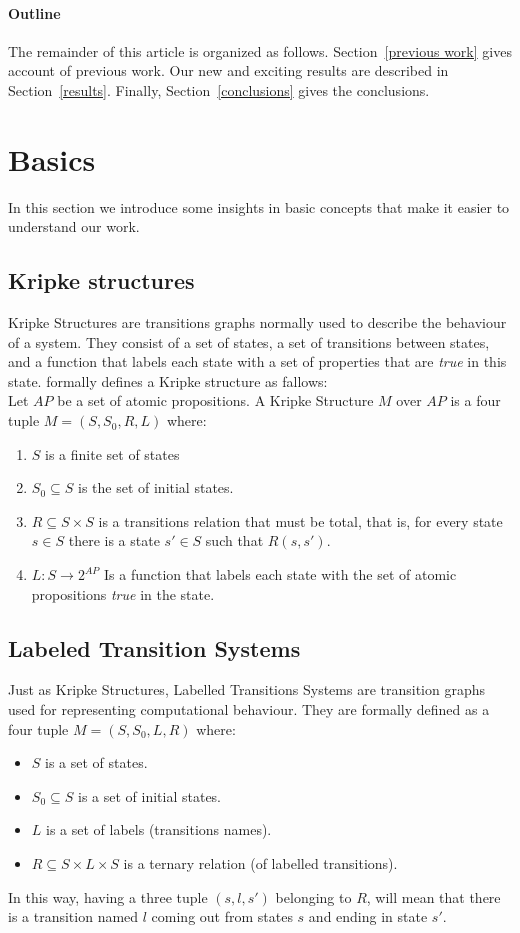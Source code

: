 \documentclass[12pt]{article}
\begin{document}
\paragraph{Outline}
The remainder of this article is organized as follows.
Section~\ref{previous work} gives account of previous work.
Our new and exciting results are described in Section~\ref{results}.
Finally, Section~\ref{conclusions} gives the conclusions.


\section{Basics}\label{basics}
In this section we introduce some insights in basic concepts that make it
easier to understand our work.

\subsection{Kripke structures}\label{kripke}
Kripke Structures are transitions graphs normally used to describe the behaviour of a system. They consist of a set of states, a set of transitions between states, and a function that labels each state with a set of properties that are \textit{true} in this state. \cite{clarke} formally defines a Kripke structure as fallows:\\

Let $AP$ be a set of atomic propositions. A Kripke Structure $M$ over $AP$ is a four tuple $M=(S,S_0,R,L)$ where:
\begin{enumerate}
\item $S$ is a finite set of states
\item $S_0 \subseteq S$ is the set of initial states.
\item $R \subseteq S \times S$ is a transitions relation that must be total, that is, for every state $s \in S$ there is a state $s' \in S$ such that $R(s,s')$.
\item $L : S \rightarrow 2^{AP}$ Is a function that labels each state with the set of atomic propositions \textit{true} in the state.
\end{enumerate}


\subsection{Labeled Transition Systems}\label{lts}
Just as Kripke Structures, Labelled Transitions Systems are transition graphs used for representing computational behaviour. They are formally defined as a four tuple $M = (S,S_{0},L,R)$ where:
\begin{itemize}
\item $S$ is a set of states.
\item $S_0 \subseteq S$ is a set of initial states.
\item $L$ is a set of labels (transitions names).
\item $R \subseteq S \times L \times S$ is a ternary relation (of labelled transitions).
\end{itemize}
In this way, having a three tuple $(s,l,s')$ belonging to $R$, will mean that there is a transition named $l$ coming out from states $s$ and ending in state $s'$.
\end{document}
